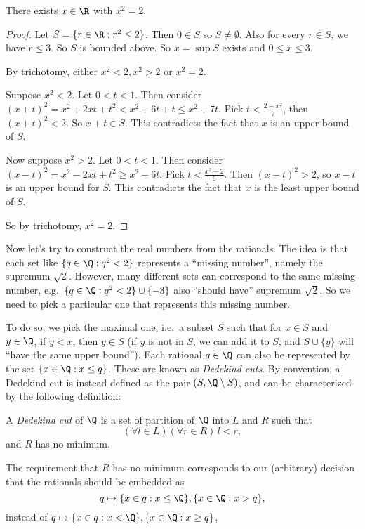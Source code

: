 \documentclass[a4paper]{article}
\begin{document}
\begin{thm}
  There exists $x\in \R$ with $x^2 = 2$.
\end{thm}

\begin{proof}
  Let $S = \{r\in \R: r^2 \leq 2\}$. Then $0\in S$ so $S\not= \emptyset$. Also for every $r \in S$, we have $r \leq 3$. So $S$ is bounded above. So $x = \sup S$ exists and $0\leq x \leq 3$.

  By trichotomy, either $x^2 < 2, x^2 > 2$ or $x^2 = 2$.

  Suppose $x^2 < 2$. Let $0 < t < 1$. Then consider $(x + t)^2 = x^2 + 2xt + t^2 < x^2 + 6t + t \leq x^2 + 7t$. Pick $t < \frac{2 - x^2}{7}$, then $(x + t)^2 < 2$. So $x + t \in S$. This contradicts the fact that $x$ is an upper bound of $S$.

  Now suppose $x^2 > 2$. Let $0 < t < 1$. Then consider $(x - t)^2 = x^2 - 2xt + t^2 \geq x^2 - 6t$. Pick $t < \frac{x^2 - 2}{6}$. Then $(x - t)^2 > 2$, so $x - t$ is an upper bound for $S$. This contradicts the fact that $x$ is the least upper bound of $S$.

  So by trichotomy, $x^2 = 2$.
\end{proof}

Now let's try to construct the real numbers from the rationals. The idea is that each set like $\{q\in \Q: q^2 < 2\}$ represents a ``missing number'', namely the supremum $\sqrt{2}$. However, many different sets can correspond to the same missing number, e.g.\ $\{q \in \Q: q^2 < 2\} \cup \{-3\}$ also ``should have'' supremum $\sqrt{2}$. So we need to pick a particular one that represents this missing number.

To do so, we pick the maximal one, i.e.\ a subset $S$ such that for $x \in S$ and $y \in \Q$, if $y < x$, then $y \in S$ (if $y$ is not in $S$, we can add it to $S$, and $S \cup \{y\}$ will ``have the same upper bound''). Each rational $q \in \Q$ can also be represented by the set $\{x \in \Q: x \leq q\}$. These are known as \emph{Dedekind cuts}. By convention, a Dedekind cut is instead defined as the pair $(S, \Q \setminus S)$, and can be characterized by the following definition:

\begin{defi}
  A \emph{Dedekind cut} of $\Q$ is a set of partition of $\Q$ into $L$ and $R$ such that
  \[
    (\forall l\in L)(\forall r\in R)\,l < r,
  \]
  and $R$ has no minimum.
\end{defi}
The requirement that $R$ has no minimum corresponds to our (arbitrary) decision that the rationals should be embedded as
\[
  q\mapsto \{x\in q: x \leq \Q\}, \{x\in \Q: x> q\},
\]
instead of $q\mapsto \{x\in q: x < \Q\}, \{x\in \Q: x \geq q\}$,
\end{document}
